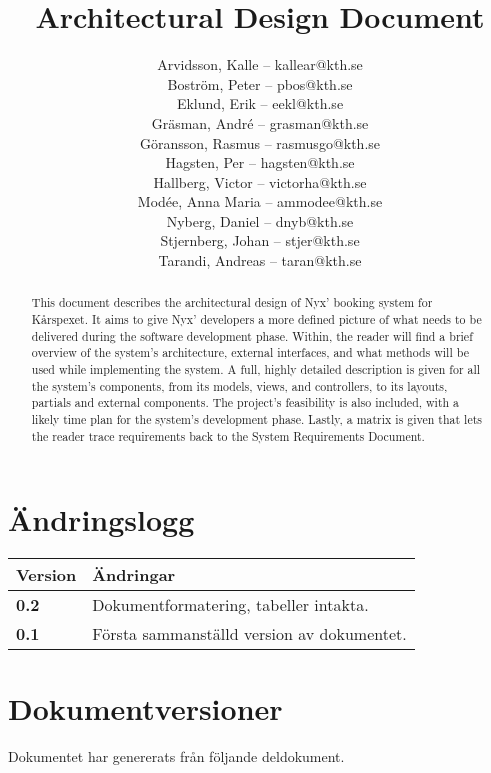 \documentclass[a4paper, twoside, 11pt, titlepage]{article}
\author{
	\small
	Arvidsson, Kalle -- kallear@kth.se\\
	Boström, Peter -- pbos@kth.se\\
	Eklund, Erik -- eekl@kth.se\\
	Gräsman, André -- grasman@kth.se\\
	Göransson, Rasmus -- rasmusgo@kth.se\\
	Hagsten, Per -- hagsten@kth.se\\
	Hallberg, Victor -- victorha@kth.se\\
	Modée, Anna Maria -- ammodee@kth.se\\
	Nyberg, Daniel -- dnyb@kth.se\\
	Stjernberg, Johan -- stjer@kth.se\\
	Tarandi, Andreas -- taran@kth.se
	}
\title{Architectural Design Document}
\begin{document}
\maketitle

\clearpage
\thispagestyle{empty}
\mbox{}
\newpage

\begin{abstract}
	This document describes the architectural design of Nyx' booking system for Kårspexet. It aims to give Nyx' developers  a more defined picture of what needs to be delivered during the software development phase.
Within, the reader will find a brief overview of the system's architecture, external interfaces, and what methods will be used while implementing the system. A full, highly detailed description is given for all the system's components, from its models, views, and controllers, to its layouts, partials and external components. The project's feasibility is also included, with a likely time plan for the system's development phase. Lastly, a matrix is given that lets the reader trace requirements back to the System Requirements Document.
\end{abstract}

\newpage

\setcounter{page}{1}

\startfooter

\clearpage
\section*{Ändringslogg}


\begin {table} [ht] \begin{tabular} { p{2.6cm} p{12.5cm} }
	\hline
	{\sffamily\textbf{Version}} & {\sffamily\textbf{Ändringar}} \\
	\hline
	{\sffamily\textbf{0.2}} & {Dokumentformatering, tabeller intakta.} \\
	\hline
	{\sffamily\textbf{0.1}} & {Första sammanställd version av dokumentet.} \\
	\hline
\end{tabular} \end{table} \FloatBarrier


\clearpage
\section*{Dokumentversioner}


Dokumentet har genererats från följande deldokument.
\end{document}
